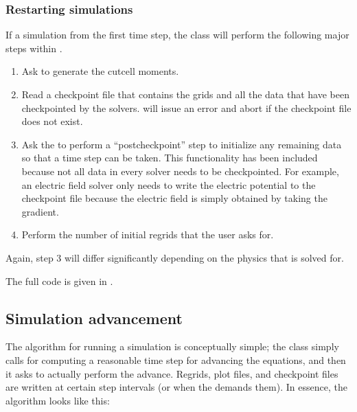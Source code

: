 \documentclass[letterpaper,10pt,english]{sphinxmanual}
\begin{document}
\subsubsection{Restarting simulations}
\label{\detokenize{Source/Driver:restarting-simulations}}
If a simulation  from the first time step, the  class will perform the following major steps within .
\begin{enumerate}
%
\item {} 
Ask  to generate the cut\sphinxhyphen{}cell moments.

\item {} 
Read a checkpoint file that contains the grids and all the data that have been checkpointed by the solvers.
 will issue an error and abort if the checkpoint file does not exist.

\item {} 
Ask the  to perform a “post\sphinxhyphen{}checkpoint” step to initialize any remaining data so that a time step can be taken.
This functionality has been included because not all data in every solver needs to be checkpointed.
For example, an electric field solver only needs to write the electric potential to the checkpoint file because the electric field is simply obtained by taking the gradient.

\item {} 
Perform the number of initial regrids that the user asks for.

\end{enumerate}

Again, step 3 will differ significantly depending on the physics that is solved for.

The full code is given in .


\subsection{Simulation advancement}
\label{\detokenize{Source/Driver:simulation-advancement}}
The algorithm for running a simulation is conceptually simple; the  class simply calls  for computing a reasonable time step for advancing the equations, and then it asks  to actually perform the advance.
Regrids, plot files, and checkpoint files are written at certain step intervals (or when the  demands them).
In essence, the algorithm looks like this:
\end{document}
